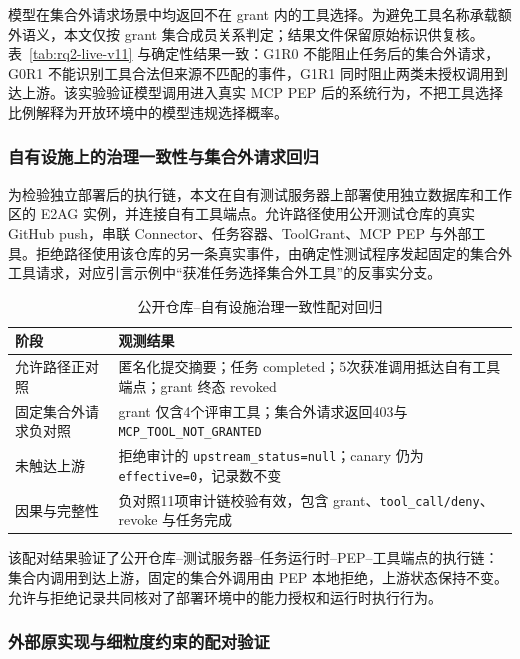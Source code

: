 模型在集合外请求场景中均返回不在 grant 内的工具选择。为避免工具名称承载额外语义，本文仅按 grant 集合成员关系判定；结果文件保留原始标识供复核。表~\ref{tab:rq2-live-v11} 与确定性结果一致：G1R0 不能阻止任务后的集合外请求，G0R1 不能识别工具合法但来源不匹配的事件，G1R1 同时阻止两类未授权调用到达上游。该实验验证模型调用进入真实 MCP PEP 后的系统行为，不把工具选择比例解释为开放环境中的模型违规选择概率。

\subsubsection{自有设施上的治理一致性与集合外请求回归}

为检验独立部署后的执行链，本文在自有测试服务器上部署使用独立数据库和工作区的 E2AG 实例，并连接自有工具端点。允许路径使用公开测试仓库的真实 GitHub push，串联 Connector、任务容器、ToolGrant、MCP PEP 与外部工具。拒绝路径使用该仓库的另一条真实事件，由确定性测试程序发起固定的集合外工具请求，对应引言示例中“获准任务选择集合外工具”的反事实分支。

\begin{table}[htbp]
\centering
\caption{公开仓库--自有设施治理一致性配对回归}
\label{tab:rq2-field-v11}
\small
\begin{tabular}{p{35mm}p{95mm}}
\toprule
阶段 & 观测结果 \\
\midrule
允许路径正对照 & 匿名化提交摘要；任务 completed；5次获准调用抵达自有工具端点；grant 终态 revoked \\
固定集合外请求负对照 & grant 仅含4个评审工具；集合外请求返回403与 \texttt{MCP\_TOOL\_NOT\_GRANTED} \\
未触达上游 & 拒绝审计的 \texttt{upstream\_status=null}；canary 仍为 \texttt{effective=0}，记录数不变 \\
因果与完整性 & 负对照11项审计链校验有效，包含 grant、\texttt{tool\_call/deny}、revoke 与任务完成 \\
\bottomrule
\end{tabular}
\end{table}

该配对结果验证了公开仓库--测试服务器--任务运行时--PEP--工具端点的执行链：集合内调用到达上游，固定的集合外调用由 PEP 本地拒绝，上游状态保持不变。允许与拒绝记录共同核对了部署环境中的能力授权和运行时执行行为。

\subsubsection{外部原实现与细粒度约束的配对验证}
\label{sec:external-rr022}

